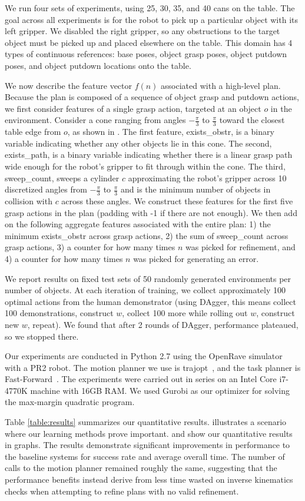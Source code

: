 We run four sets of experiments, using 25, 30, 35, and 40 cans on the table.
The goal across all experiments is for the robot to pick up a particular object with its
left gripper. We disabled the right gripper, so any obstructions to the target object must be picked up and
placed elsewhere on the table. This domain has 4 types of continuous references: base poses, object grasp
poses, object putdown poses, and object putdown locations onto the table.

We now describe the feature vector $f(n)$ associated with a high-level plan. Because the plan is composed
of a sequence of object grasp and putdown actions, we first consider features of a single grasp action, targeted
at an object $o$ in the environment. Consider a cone ranging from angles $-\frac{\pi}{3}$ to $\frac{\pi}{3}$
toward the closest table edge from $o$, as shown in . The first feature, exists\_obstr, is a binary variable indicating
whether any other objects lie in this cone. The second, exists\_path, is a binary variable indicating whether there is a linear
grasp path wide enough for the robot's gripper to fit through within the cone. The third, sweep\_count, sweeps
a cylinder $c$ approximating the robot's gripper across 10 discretized angles from $-\frac{\pi}{3}$ to
$\frac{\pi}{3}$ and is the minimum number of objects in collision with $c$ across these angles.
We construct these features for the first five grasp actions in the plan (padding with -1 if there are not enough).
We then add on the following aggregate features associated with the entire plan: 1) the minimum exists\_obstr across grasp actions,
2) the sum of sweep\_count across grasp actions, 3) a counter for how many times $n$ was picked for refinement, and
4) a counter for how many times $n$ was picked for generating an error.

We report results on fixed test sets of 50 randomly generated environments per number of objects. At each
iteration of training, we collect approximately 100 optimal actions from the human demonstrator (using
DAgger, this means collect 100 demonstrations, construct $w$, collect 100 more while rolling out $w$, construct new $w$, repeat).
We found that after 2 rounds of DAgger, performance plateaued, so we stopped there.

Our experiments are conducted in Python 2.7 using the OpenRave simulator~\cite{Diankov_2008_6117} with a PR2 robot.
The motion planner we use is trajopt~\cite{schulman2013finding}, and the task planner is Fast-Forward~\cite{FF}.
The experiments were carried out in series on an Intel Core i7-4770K machine with 16GB RAM. We used Gurobi
as our optimizer for solving the max-margin quadratic program.

Table \ref{table:results} summarizes our quantitative results.  illustrates a scenario where
our learning methods prove important.  and  show our quantitative
results in graphs. The results demonstrate significant improvements in performance to the baseline systems for success rate and
average overall time. The number of calls to the motion planner remained roughly the same,
suggesting that the performance benefits instead derive from less time wasted on inverse kinematics checks when
attempting to refine plans with no valid refinement.
